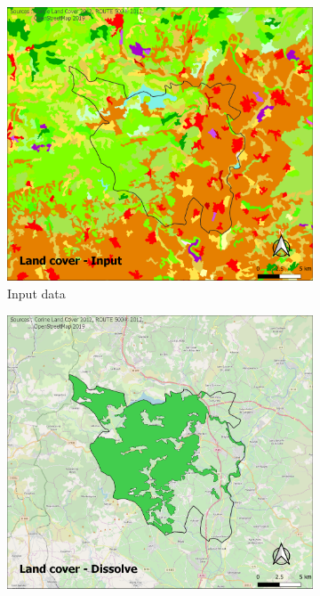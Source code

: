 \documentclass[11pt]{article}
\begin{document}
\begin{figure}[h!]
\centering
   \begin{subfigure}[b]{.48\textwidth}
      \includegraphics[width=\textwidth]{pictures/landuseInput.png}
      \caption{Input data}
   \end{subfigure}
   \begin{subfigure}[b]{.48\textwidth}
      \includegraphics[width=\textwidth]{pictures/landuseDissolve.png}

\end{subfigure}
\end{figure}
\end{document}
